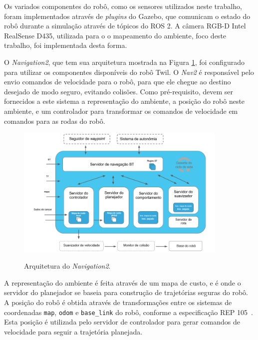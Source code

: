 \documentclass[repeatfields,xlists,xpacks,oneside,yearsonly]{ufrgscca}
\begin{document}
Os variados componentes do robô, como os sensores utilizados neste
trabalho, foram implementados através de \textit{plugins} do Gazebo,
que comunicam o estado do robô durante a simulação através de tópicos
do ROS 2. A câmera RGB-D Intel RealSense D435, utilizada para o o
mapeamento do ambiente, foco deste trabalho, foi implementada desta
forma.

O \textit{Navigation2}, que tem sua arquitetura mostrada na Figura
\ref{fig:nav2_arc}, foi configurado para utilizar os componentes
disponíveis do robô Twil. O \textit{Nav2} é responsável pelo envio
comandos de velocidade para o robô, para que ele chegue ao destino
desejado de modo seguro, evitando colisões. Como pré-requisito, devem
ser fornecidos a este sistema a representação do ambiente, a posição
do robô neste ambiente, e um controlador para transformar os comandos
de velocidade em comandos para as rodas do robô.

\begin{figure}[h]
    {
        \centering
        \caption{Arquitetura do \textit{Navigation2}.}
        \label{fig:nav2_arc}
        \includegraphics[width=0.9\textwidth]{nav2_architecture_trad.png}\\
    }
    {} %
\end{figure}

A representação do ambiente é feita através de um mapa de custo, e é
onde o servidor do planejador se baseia para construção de
trajetórias seguras do robô. A posição do robô é obtida através de
transformações entre os sistemas de coordenadas \texttt{map},
\texttt{odom} e \texttt{base\_link} do robô, conforme a especificação
REP 105~\cite{rep_105}. Esta posição é utilizada pelo servidor de
controlador para gerar comandos de velocidade para seguir a
trajetória planejada.
\end{document}
